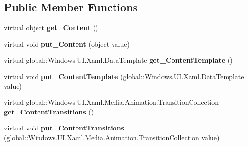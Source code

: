 \subsection*{Public Member Functions}
\begin{DoxyCompactItemize}
\item 
\mbox{\label{class_windows_1_1_u_i_1_1_xaml_1_1_controls_1_1_content_control_a1398a502667d7adf98f72f4ae5c485c9}} 
virtual object {\bfseries get\+\_\+\+Content} ()
\item 
\mbox{\label{class_windows_1_1_u_i_1_1_xaml_1_1_controls_1_1_content_control_ac840a1532f5f739ccb323a723b58454b}} 
virtual void {\bfseries put\+\_\+\+Content} (object value)
\item 
\mbox{\label{class_windows_1_1_u_i_1_1_xaml_1_1_controls_1_1_content_control_a5cc3b93bc15a1c9c0ed277ec8dc6dfe9}} 
virtual global\+::\+Windows.\+U\+I.\+Xaml.\+Data\+Template {\bfseries get\+\_\+\+Content\+Template} ()
\item 
\mbox{\label{class_windows_1_1_u_i_1_1_xaml_1_1_controls_1_1_content_control_ab0e5c4f7859f68ed01991a8e932e4bda}} 
virtual void {\bfseries put\+\_\+\+Content\+Template} (global\+::\+Windows.\+U\+I.\+Xaml.\+Data\+Template value)
\item 
\mbox{\label{class_windows_1_1_u_i_1_1_xaml_1_1_controls_1_1_content_control_a074c0bbf88ba02121501aea5d840d64f}} 
virtual global\+::\+Windows.\+U\+I.\+Xaml.\+Media.\+Animation.\+Transition\+Collection {\bfseries get\+\_\+\+Content\+Transitions} ()
\item 
\mbox{\label{class_windows_1_1_u_i_1_1_xaml_1_1_controls_1_1_content_control_aa5fc9bac28b70e7fe86efcb229e8c57d}} 
virtual void {\bfseries put\+\_\+\+Content\+Transitions} (global\+::\+Windows.\+U\+I.\+Xaml.\+Media.\+Animation.\+Transition\+Collection value)
\item 
\mbox{\label{class_windows_1_1_u_i_1_1_xaml_1_1_controls_1_1_content_control_a1b8d96eef56757cec1eb123b64b62fe4}} 

\end{DoxyCompactItemize}
